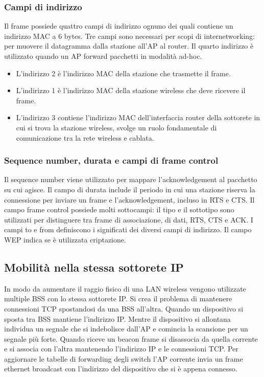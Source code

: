 \subsubsection{Campi di indirizzo}
Il frame possiede quattro campi di indirizzo ognuno dei quali contiene un indirizzo MAC a 6 bytes. Tre campi sono necessari per scopi di internetworking: per muovere il datagramma dalla stazione all'AP al
router. Il quarto indirizzo \`e utilizzato quando un AP forward pacchetti in modalit\`a ad-hoc. 
\begin{itemize}
\item L'indirizzo 2 \`e l'indirizzo MAC della stazione che trasmette il frame. 
\item L'indirizzo 1 \`e l'indirizzo MAC della stazione wireless che deve ricevere il frame. 
\item L'indirizzo 3 contiene l'indirizzo MAC dell'interfaccia router della sottorete in cui si trova la stazione wireless, svolge un ruolo fondamentale di comunicazione tra la rete wireless e cablata.
\end{itemize}
\subsubsection{Sequence number, durata  e campi di frame control}
Il sequence number viene utilizzato per mappare l'acknowledgement al pacchetto su cui agisce. Il campo di durata include il periodo in cui una stazione riserva la connessione per inviare un frame e 
l'acknowledgement, incluso in RTS e CTS. Il campo frame control possiede molti sottocampi: il tipo e il sottotipo sono utilizzati per distinguere tra frame di associazione, di dati, RTS, CTS e ACK. I campi to e 
from definiscono i significati dei diversi campi di indirizzo. Il campo WEP indica se \`e utilizzata criptazione.
\subsection{Mobilit\`a nella stessa sottorete IP}
In modo da aumentare il raggio fisico di una LAN wireless vengono utilizzate multiple BSS con lo stessa sottorete IP. Si crea il problema di mantenere connessioni TCP spostandosi da una BSS all'altra. Quando
un dispositivo si sposta tra BSS mantiene l'indirizzo IP. Mentre il dispositivo si allontana individua un segnale che si indebolisce dall'AP e comincia la scansione per un segnale pi\`u forte. Quando riceve un 
beacon frame si disassocia da quella corrente e si associa con l'altra mantenendo l'indirizzo IP e le connessioni TCP. Per aggiornare le tabelle di forwarding degli switch l'AP corrente invia un frame ethernet 
broadcast con l'indirizzo del dispositivo che si \`e appena connesso. 
